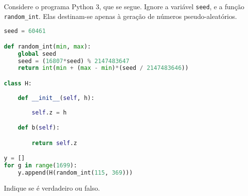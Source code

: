 \documentclass[12pt,varwidth=16cm,border=17pt]{standalone}
\begin{document}
Considere o programa Python 3, que se segue. Ignore a variável \verb+seed+, e a função \verb+random_int+. 
Elas destinam-se apenas à geração de números pseudo-aleatórios.

\begin{lstlisting}[language=Python]
seed = 60461

def random_int(min, max):
    global seed
    seed = (16807*seed) % 2147483647
    return int(min + (max - min)*(seed / 2147483646))

class H:
    
    def __init__(self, h):
        
        self.z = h

    def b(self):

        return self.z

y = []
for g in range(1699):
    y.append(H(random_int(115, 369)))
\end{lstlisting}

Indique se é verdadeiro ou falso.
\end{document}
